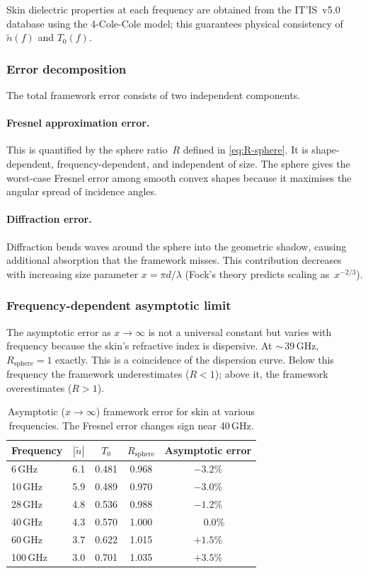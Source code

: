 \documentclass[11pt,a4paper]{article}
\theoremstyle{definition}      %
\newcommand{\ntilde}{\tilde{n}}
\begin{document}
Skin dielectric properties at each frequency are obtained from the
IT'IS~v5.0 database using the 4-Cole-Cole model; this guarantees
physical consistency of $\ntilde(f)$ and $T_0(f)$.

\subsubsection{Error decomposition}

The total framework error consists of two independent components.

\paragraph{Fresnel approximation error.}
This is quantified by the sphere ratio~$R$ defined in
\cref{eq:R-sphere}.  It is shape-dependent, frequency-dependent, and
independent of size.  The sphere gives the worst-case Fresnel error
among smooth convex shapes because it maximises the angular spread of
incidence angles.

\paragraph{Diffraction error.}
Diffraction bends waves around the sphere into the geometric shadow,
causing additional absorption that the framework misses.  This
contribution decreases with increasing size parameter
$x=\pi d/\lambda$ (Fock's theory predicts scaling as~$x^{-2/3}$).

\subsubsection{Frequency-dependent asymptotic limit}

The asymptotic error as $x\to\infty$ is not a universal constant but
varies with frequency because the skin's refractive index is
dispersive.  At ${\sim}\,39$\,GHz,
$R_{\mathrm{sphere}}=1$ exactly. This is a coincidence of the dispersion
curve.  Below this frequency the framework underestimates
($R<1$); above it, the framework overestimates ($R>1$).

\begin{table}[!htbp]
\centering
\caption{Asymptotic ($x\to\infty$) framework error for skin at
  various frequencies.  The Fresnel error changes sign near
  40\,GHz.}\label{tab:mie-asymptotic}
\begin{tabular}{lcccc}
\toprule
Frequency & $|\ntilde|$ & $T_0$ & $R_{\mathrm{sphere}}$
  & Asymptotic error \\
\midrule
6\,GHz   & 6.1 & 0.481 & 0.968 & $-3.2\%$  \\
10\,GHz  & 5.9 & 0.489 & 0.970 & $-3.0\%$  \\
28\,GHz  & 4.8 & 0.536 & 0.988 & $-1.2\%$  \\
40\,GHz  & 4.3 & 0.570 & 1.000 & $\phantom{+}0.0\%$ \\
60\,GHz  & 3.7 & 0.622 & 1.015 & $+1.5\%$  \\
100\,GHz & 3.0 & 0.701 & 1.035 & $+3.5\%$  \\
\bottomrule
\end{tabular}
\end{table}
\end{document}
